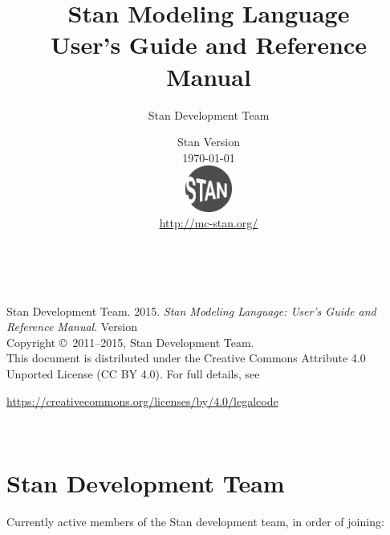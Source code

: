 \title{\Huge\bf Stan Modeling Language \\[4pt] {\LARGE User's Guide
    and Reference Manual}}
\author{Stan Development Team}

\date{\vspace*{36pt} Stan Version \stanversion
\\[8pt] {\small \today}
\\[36pt]
{
\vfill
\includegraphics[width=0.6in]{img/stanlogo-main.pdf}}
\\
\vspace*{6pt}
{\small \url{http://mc-stan.org/}}
}
\maketitle

\newpage
\thispagestyle{empty}
\mbox{ }
\vfill
\begin{center}
\begin{minipage}[t]{0.75\textwidth}
\small
Stan Development Team. 2015.  
{\it Stan Modeling Language: User's Guide and Reference Manual}. Version
\stanversion
\vspace*{20pt}
\mbox{ }
\\
Copyright \copyright \ 2011--2015, Stan Development Team.
\vspace*{28pt}
\mbox{} \\
This document is distributed under the Creative Commons Attribute 4.0
Unported License (CC BY 4.0).  For full details, see
\begin{center}
\url{https://creativecommons.org/licenses/by/4.0/legalcode} 
\end{center}
\end{minipage}
\vspace*{24pt}
\mbox{ }
\end{center}

\newpage
\section*{Stan Development Team}

Currently active members of the Stan development team, in order of joining:

